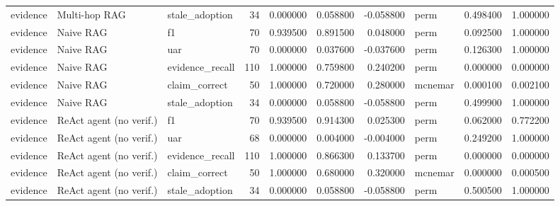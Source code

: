 \begin{table}
\begin{tabular}{lllrrrrlrr}
evidence & Multi-hop RAG & stale\_adoption & 34 & 0.000000 & 0.058800 & -0.058800 & perm & 0.498400 & 1.000000 \\
evidence & Naive RAG & f1 & 70 & 0.939500 & 0.891500 & 0.048000 & perm & 0.092500 & 1.000000 \\
evidence & Naive RAG & uar & 70 & 0.000000 & 0.037600 & -0.037600 & perm & 0.126300 & 1.000000 \\
evidence & Naive RAG & evidence\_recall & 110 & 1.000000 & 0.759800 & 0.240200 & perm & 0.000000 & 0.000000 \\
evidence & Naive RAG & claim\_correct & 50 & 1.000000 & 0.720000 & 0.280000 & mcnemar & 0.000100 & 0.002100 \\
evidence & Naive RAG & stale\_adoption & 34 & 0.000000 & 0.058800 & -0.058800 & perm & 0.499900 & 1.000000 \\
evidence & ReAct agent (no verif.) & f1 & 70 & 0.939500 & 0.914300 & 0.025300 & perm & 0.062000 & 0.772200 \\
evidence & ReAct agent (no verif.) & uar & 68 & 0.000000 & 0.004000 & -0.004000 & perm & 0.249200 & 1.000000 \\
evidence & ReAct agent (no verif.) & evidence\_recall & 110 & 1.000000 & 0.866300 & 0.133700 & perm & 0.000000 & 0.000000 \\
evidence & ReAct agent (no verif.) & claim\_correct & 50 & 1.000000 & 0.680000 & 0.320000 & mcnemar & 0.000000 & 0.000500 \\
evidence & ReAct agent (no verif.) & stale\_adoption & 34 & 0.000000 & 0.058800 & -0.058800 & perm & 0.500500 & 1.000000 \\
\bottomrule
\end{tabular}
\end{table}
